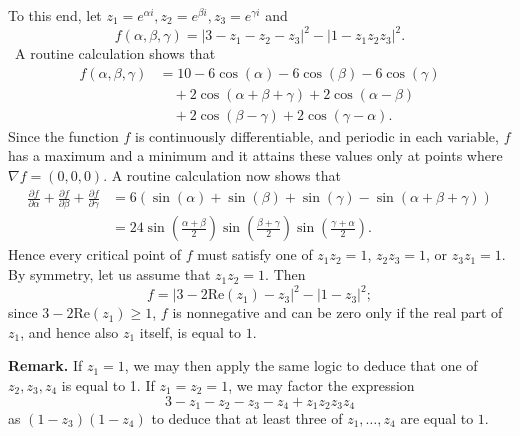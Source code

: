\documentclass[amssymb,twocolumn,pra,10pt,aps]{revtex4-1}
\begin{document}
\begin{itemize}
To this end, let $z_1=e^{\alpha i}, z_2=e^{\beta i}, z_3=e^{\gamma i}$ and 
\[
f(\alpha, \beta, \gamma)=|3-z_1-z_2-z_3|^2-|1-z_1z_2z_3|^2.
\]\
 A routine calculation shows that 
\begin{align*}
f(\alpha, \beta, \gamma)&=
10 - 6\cos(\alpha) - 6\cos(\beta) - 6\cos(\gamma) \\
&\quad + 2\cos(\alpha + \beta + \gamma) + 2\cos(\alpha - \beta) \\
&\quad + 2\cos(\beta - \gamma) + 2\cos(\gamma - \alpha).
\end{align*}
Since the function $f$ is continuously differentiable, and periodic in each variable, $f$ has a maximum and a minimum and it attains these values only at points where $\nabla f=(0,0,0)$.  A routine calculation now shows that 
\begin{align*}
\frac{\partial f}{\partial \alpha} + \frac{\partial f}{\partial \beta} + \frac{\partial f}{\partial \gamma} &=
6(\sin(\alpha) +\sin(\beta)+\sin(\gamma)-  \sin(\alpha + \beta + \gamma)) \\
&=
24\sin\left(\frac{\alpha+\beta}{2}\right) \sin\left(\frac{\beta+\gamma}{2}\right)
\sin\left(\frac{\gamma+\alpha}{2}\right).
\end{align*}
Hence every critical point of $f$ must satisfy one of $z_1z_2=1$, $z_2z_3=1$, or $z_3z_1=1$. By symmetry, let us assume that $z_1z_2=1$. Then 
\[
f = |3-2\mathrm{Re}(z_1)-z_3|^2-|1-z_3|^2;
\]
since $3-2\mathrm{Re}(z_1)\ge 1$, $f$ is nonnegative and can be zero only if the real part of $z_1$, and hence also $z_1$ itself, is equal to $1$. 

\noindent
\textbf{Remark.}
If $z_1 = 1$, we may then apply the same logic to deduce that one of $z_2,z_3,z_4$ is equal to 1. If $z_1 = z_2 = 1$, we may factor the expression
\[
3 - z_1 - z_2 - z_3 - z_4 + z_1 z_2 z_3 z_4
\]
as $(1 - z_3)(1-z_4)$ to deduce that at least three of $z_1, \dots, z_4$ are equal to $1$.


\end{itemize}
\end{document}
